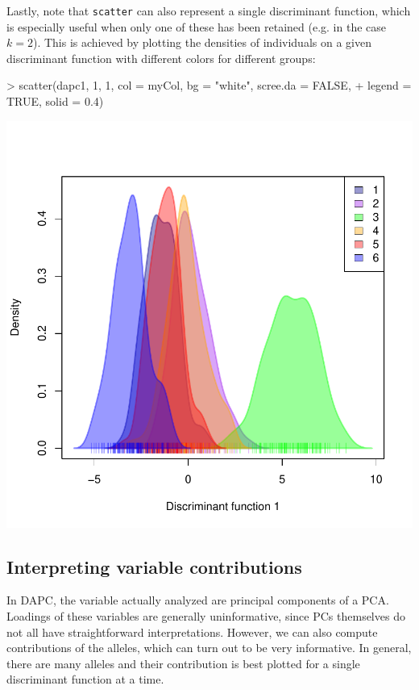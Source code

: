 \documentclass{article}
\begin{document}
Lastly, note that \texttt{scatter} can also represent a single discriminant function, which is
especially useful when only one of these has been retained (e.g. in the case $k=2$).
This is achieved by plotting the densities of individuals on a given discriminant function with
different colors for different groups:
\begin{Schunk}
\begin{Sinput}
> scatter(dapc1, 1, 1, col = myCol, bg = "white", scree.da = FALSE, 
+     legend = TRUE, solid = 0.4)
\end{Sinput}
\end{Schunk}
\includegraphics{figs/dapc-015}




\subsection{Interpreting variable contributions}

In DAPC, the variable actually analyzed are principal components of a PCA.
Loadings of these variables are generally uninformative, since PCs themselves do not all have
straightforward interpretations.
However, we can also compute contributions of the alleles, which can turn out to be very informative.
In general, there are many alleles and their contribution is best plotted for a single discriminant
function at a time.
\end{document}
